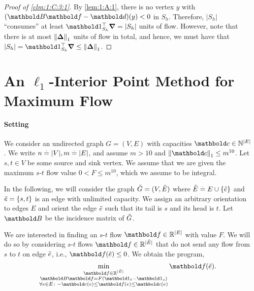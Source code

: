 \documentclass[nobib]{tufte-handout}
\newcommand{\Etil}{\Tilde{E}}
\newcommand{\etil}{\Tilde{e}}
\begin{document}
\begin{proof}[Proof of \cref{clm:1:C:3:1}]
By \cref{lem:1:A:1}, there is no vertex $y$ with $(\mB\vf - \vd)(y) < 0$ in $S_h$. Therefore, $|S_h|$ ``consumes'' at least $\trans{\vOne}_{S_h}\vnabla = |S_h|$ units of flow. However, note that there is at most $\norm{\vDelta}_1$ units of flow in total, and hence, we must have that $|S_h| = \trans{\vOne}_{S_h}\vnabla \leq \norm{\vDelta}_1$.
\end{proof}

\section{An $\ell_1$-Interior Point Method for Maximum Flow}

\paragraph{Setting} We consider an undirected graph $G = (V,E)$ with capacities $\vc \in \Nat^{|E|}$. We write $n \overset{.}{=} |V|, m \overset{.}{=} |E|$, and assume $m > 10$ and $\norm{\vc}_1 \leq m^{10}$. Let $s, t \in V$ be some source and sink vertex. We assume that we are given the maximum $s$-$t$ flow value $0 < F \leq m^{10}$, which we assume to be integral.

In the following, we will consider the graph $\Tilde{G} = (V, \Etil)$ where $\Etil \defeq E \cup \{\etil\}$ and $\etil = \{s,t\}$ is an edge with unlimited capacity. We assign an arbitrary orientation to edges $E$ and orient the edge $\etil$ such that its tail is $s$ and its head is $t$. Let $\mB$ be the incidence matrix of $\Tilde{G}$.

We are interested in finding an $s$-$t$ flow $\vf \in \R^{|E|}$ with value $F$. We will do so by considering $s$-$t$ flows $\vf \in \R^{|\Etil|}$ that do not send any flow from $s$ to $t$ on edge $\etil$, i.e., $\vf(\etil) \leq 0$. We obtain the program, \begin{align}
    \min_{\substack{\vf \in \R^{|\Etil|} \\ \mB\vf = F(\vOne_t - \vOne_s) \\ \forall e \in E \colon -\vc(e) \leq \vf(e) \leq \vc(e)}} \vf(\etil). \label{eq:2:program}
\end{align}
\end{document}
